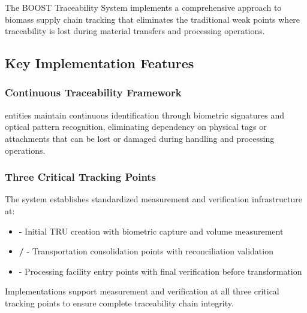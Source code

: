 
The BOOST Traceability System implements a comprehensive approach to biomass supply chain tracking that eliminates the traditional weak points where traceability is lost during material transfers and processing operations.

\subsection{Key Implementation Features}
\label{sec:key-implementation-features}

\subsubsection{Continuous Traceability Framework}
\label{sec:traceability-continuous-framework}

\begin{important}[title=Comprehensive Traceability Approach]
\TRU{} entities maintain continuous identification through biometric signatures and optical pattern recognition, eliminating dependency on physical tags or attachments that can be lost or damaged during handling and processing operations.
\end{important}

\subsubsection{Three Critical Tracking Points}
\label{sec:three-critical-tracking-points}

The system establishes standardized measurement and verification infrastructure at:

\begin{itemize}
    \item \textbf{} - Initial TRU creation with biometric capture and volume measurement
    \item \textbf{/} - Transportation consolidation points with reconciliation validation
    \item \textbf{} - Processing facility entry points with final verification before transformation
\end{itemize}

\begin{normative}[title=Critical Tracking Point Requirements]
Implementations \MUST{} support measurement and verification at all three critical tracking points to ensure complete traceability chain integrity.
\end{normative}

